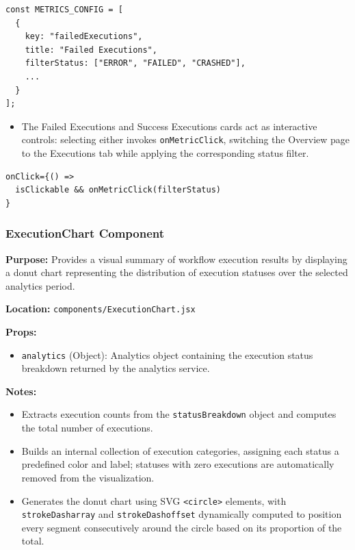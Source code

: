 \begin{center}
\begin{minipage}{0.6\textwidth}
\begin{lstlisting}
const METRICS_CONFIG = [
  {
    key: "failedExecutions",
    title: "Failed Executions",
    filterStatus: ["ERROR", "FAILED", "CRASHED"],
    ...
  }
];
\end{lstlisting}
\end{minipage}
\end{center}

\begin{itemize}
    \item The Failed Executions and Success Executions cards act as interactive controls: selecting either invokes \texttt{onMetricClick}, switching the Overview page to the Executions tab while applying the corresponding status filter.
\end{itemize}

\begin{center}
\begin{minipage}{0.6\textwidth}
\begin{lstlisting}
onClick={() =>
  isClickable && onMetricClick(filterStatus)
}
\end{lstlisting}
\end{minipage}
\end{center}

\subsubsection{ExecutionChart Component}

\textbf{Purpose:} Provides a visual summary of workflow execution results by displaying a donut chart representing the distribution of execution statuses over the selected analytics period.

\vspace{0.2cm}
\noindent\textbf{Location:} \texttt{components/ExecutionChart.jsx}

\vspace{0.2cm}
\noindent\textbf{Props:}
\begin{itemize}
    \item \texttt{analytics} (Object): Analytics object containing the execution status breakdown returned by the analytics service.
\end{itemize}

\vspace{0.2cm}
\noindent\textbf{Notes:}
\begin{itemize}
    \item Extracts execution counts from the \texttt{statusBreakdown} object and computes the total number of executions.
    \item Builds an internal collection of execution categories, assigning each status a predefined color and label; statuses with zero executions are automatically removed from the visualization.
    \item Generates the donut chart using SVG \texttt{<circle>} elements, with \texttt{strokeDasharray} and \texttt{strokeDashoffset} dynamically computed to position every segment consecutively around the circle based on its proportion of the total.
\end{itemize}

